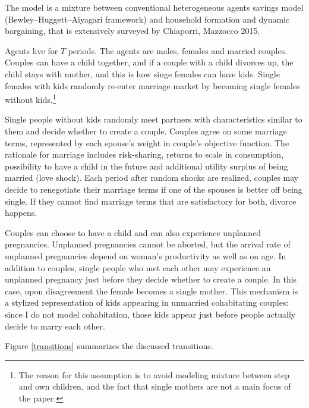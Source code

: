 The model is a mixture between conventional heterogeneous agents savings model (Bewley--Huggett--Aiyagari framework) and household formation and dynamic bargaining, that is extensively surveyed by Chiaporri, Mazzocco 2015. 

Agents live for $T$ periods. The agents are males, females and married couples. Couples can have a child together, and if a couple with a child divorces up, the child stays with mother, and this is how singe females can have kids. Single females with kids randomly re-enter marriage market by becoming single females without kids.\footnote{The reason for this assumption is to avoid modeling mixture between step and own children, and the fact that single mothers are not a main focus of the paper.}


Single people without kids randomly meet partners with characteristics similar to them and decide whether to create a couple. Couples agree on some marriage terms, represented by each spouse's weight in couple's objective function. The rationale for marriage includes risk-sharing, returns to scale in consumption, possibility to have a child in the future and additional utility surplus of being married (love shock). Each period after random shocks are realized, couples may decide to renegotiate their marriage terms if one of the spouses is better off being single. If they cannot find marriage terms that are satisfactory for both, divorce happens.

Couples can choose to have a child and can also experience unplanned pregnancies. Unplanned pregnancies cannot be aborted, but the arrival rate of unplanned pregnancies depend on woman's productivity as well as on age. In addition to couples, single people who met each other may experience an unplanned pregnancy just before they decide whether to create a couple. In this case, upon disagreement the female becomes a single mother. This mechanism is a stylized representation of kids appearing in unmarried cohabitating couples: since I do not model cohabitation, those kids appear just before people actually decide to marry each other.

Figure \ref{transitions} summarizes the discussed transitions.


